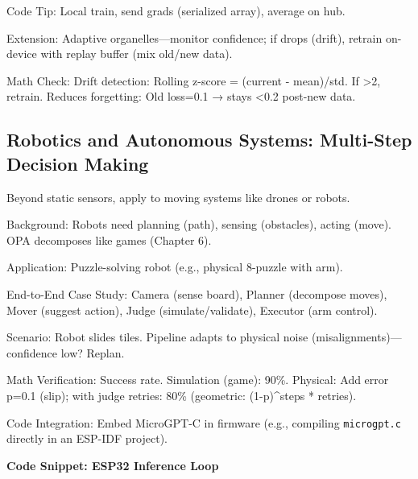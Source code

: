 \documentclass[
]{article}
\begin{document}
Code Tip: Local train, send grads (serialized array), average on hub.

Extension: Adaptive organelles---monitor confidence; if drops (drift),
retrain on-device with replay buffer (mix old/new data).

Math Check: Drift detection: Rolling z-score = (current - mean)/std. If
\textgreater2, retrain. Reduces forgetting: Old loss=0.1 → stays
\textless0.2 post-new data.

\subsection{Robotics and Autonomous Systems: Multi-Step Decision
Making}\label{robotics-and-autonomous-systems-multi-step-decision-making}

Beyond static sensors, apply to moving systems like drones or robots.

Background: Robots need planning (path), sensing (obstacles), acting
(move). OPA decomposes like games (Chapter 6).

Application: Puzzle-solving robot (e.g., physical 8-puzzle with arm).

End-to-End Case Study: Camera (sense board), Planner (decompose moves),
Mover (suggest action), Judge (simulate/validate), Executor (arm
control).

Scenario: Robot slides tiles. Pipeline adapts to physical noise
(misalignments)---confidence low? Replan.

Math Verification: Success rate. Simulation (game): 90\%. Physical: Add
error p=0.1 (slip); with judge retries: 80\% (geometric: (1-p)\^{}steps
* retries).

Code Integration: Embed MicroGPT-C in firmware (e.g., compiling
\texttt{microgpt.c} directly in an ESP-IDF project).

\textbf{Code Snippet: ESP32 Inference Loop}
\end{document}
